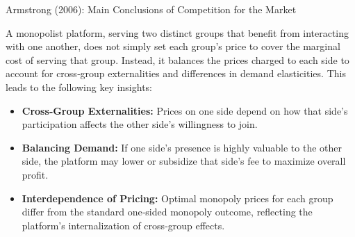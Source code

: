 \documentclass[aspectratio=169]{beamer}  %
\begin{document}
\begin{frame}{Armstrong (2006): Main Conclusions of Competition for the Market}
    \justifying  %
    
    A monopolist platform, serving two distinct groups that benefit from interacting 
    with one another, does not simply set each group’s price to cover the marginal 
    cost of serving that group. Instead, it balances the prices charged to each side 
    to account for cross‐group externalities and differences in demand elasticities.
    This leads to the following key insights:
    
    \begin{itemize}
        \item \textbf{Cross‐Group Externalities:} Prices on one side depend on how 
        that side’s participation affects the other side’s willingness to join.
    
        \item \textbf{Balancing Demand:} If one side’s presence is highly valuable 
        to the other side, the platform may lower or subsidize that side’s fee 
        to maximize overall profit.
    
        \item \textbf{Interdependence of Pricing:} Optimal monopoly prices for each 
        group differ from the standard one‐sided monopoly outcome, reflecting 
        the platform’s internalization of cross‐group effects.
    \end{itemize}
    
\end{frame}
\end{document}
